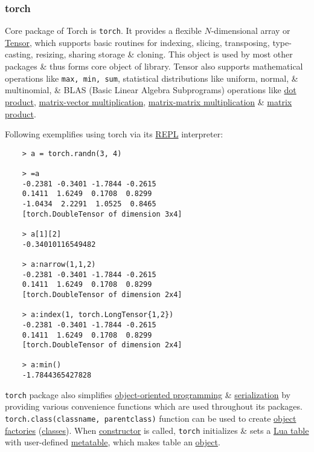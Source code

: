 \documentclass{article}
\begin{document}
\subsubsection{torch}
Core package of Torch is {\tt torch}. It provides a flexible $N$-dimensional array or \href{https://en.wikipedia.org/wiki/Tensor_(machine_learning)}{Tensor}, which supports basic routines for indexing, slicing, transposing, type-casting, resizing, sharing storage \& cloning. This object is used by most other packages \& thus forms core object of library. Tensor also supports mathematical operations like {\tt max, min, sum}, statistical distributions like uniform, normal, \& multinomial, \& BLAS (Basic Linear Algebra Subprograms) operations like \href{https://en.wikipedia.org/wiki/Dot_product}{dot product}, \href{https://en.wikipedia.org/wiki/Matrix%E2%80%93vector_multiplication}{matrix-vector multiplication}, \href{https://en.wikipedia.org/wiki/Matrix_multiplication}{matrix-matrix multiplication} \& \href{https://en.wikipedia.org/wiki/Matrix_product}{matrix product}.

Following exemplifies using torch via its \href{https://en.wikipedia.org/wiki/REPL}{REPL} interpreter:
\begin{verbatim}
	> a = torch.randn(3, 4)
	
	> =a
	-0.2381 -0.3401 -1.7844 -0.2615
	0.1411  1.6249  0.1708  0.8299
	-1.0434  2.2291  1.0525  0.8465
	[torch.DoubleTensor of dimension 3x4]
	
	> a[1][2]
	-0.34010116549482
	
	> a:narrow(1,1,2)
	-0.2381 -0.3401 -1.7844 -0.2615
	0.1411  1.6249  0.1708  0.8299
	[torch.DoubleTensor of dimension 2x4]
	
	> a:index(1, torch.LongTensor{1,2})
	-0.2381 -0.3401 -1.7844 -0.2615
	0.1411  1.6249  0.1708  0.8299
	[torch.DoubleTensor of dimension 2x4]
	
	> a:min()
	-1.7844365427828
\end{verbatim}
{\tt torch} package also simplifies \href{https://en.wikipedia.org/wiki/Object-oriented_programming}{object-oriented programming} \& \href{https://en.wikipedia.org/wiki/Serialization}{serialization} by providing various convenience functions which are used throughout its packages. {\tt torch.class(classname, parentclass)} function can be used to create \href{https://en.wikipedia.org/wiki/Factory_method_pattern}{object factories} (\href{https://en.wikipedia.org/wiki/Class_(computer_programming)}{classes}). When \href{https://en.wikipedia.org/wiki/Constructor_(object-oriented_programming)}{constructor} is called, {\tt torch} initializes \& sets a \href{https://en.wikipedia.org/wiki/Lua_(programming_language)#Tables}{Lua table} with user-defined \href{https://en.wikipedia.org/wiki/Lua_(programming_language)#Metatables}{metatable}, which makes table an \href{https://en.wikipedia.org/wiki/Object_(computer_science)}{object}.
\end{document}
